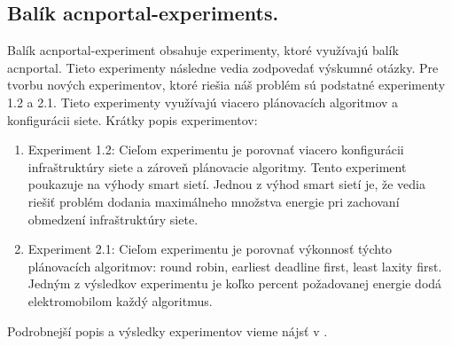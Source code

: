 \subsection{Balík acnportal-experiments.}
Balík acnportal-experiment obsahuje experimenty, ktoré využívajú balík acnportal. Tieto experimenty následne vedia zodpovedať výskumné otázky. Pre tvorbu nových experimentov, ktoré riešia náš problém sú podstatné experimenty 1.2 a 2.1. Tieto experimenty využívajú viacero plánovacích algoritmov a konfigurácii siete. Krátky popis experimentov:
\begin{enumerate}
    \item Experiment 1.2: Cieľom experimentu je porovnať viacero konfigurácii infraštruktúry siete a zároveň plánovacie algoritmy. Tento experiment poukazuje na výhody smart sietí. Jednou z výhod smart sietí je, že vedia riešiť problém dodania maximálneho množstva energie pri zachovaní obmedzení infraštruktúry siete.
    \item Experiment 2.1: Cieľom experimentu je porovnať výkonnosť týchto plánovacích algoritmov:  round robin,  earliest deadline first, least laxity first. Jedným z výsledkov experimentu je koľko percent požadovanej energie dodá elektromobilom každý algoritmus.
\end{enumerate}





Podrobnejší popis a výsledky experimentov vieme nájsť v \cite{acnportalexperimentsrepository}.





